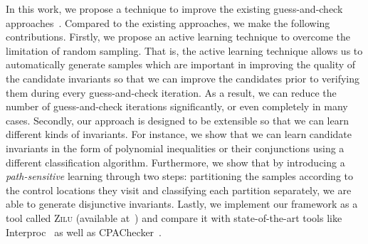 In this work, we propose a technique to improve the existing guess-and-check approaches~\cite{sharma2012interpolants,sharma2013verification,DBLP:conf/esop/0001GHALN13,sharma2014invariant}.
Compared to the existing approaches, we make the following contributions.
Firstly, we propose an active learning technique to overcome the limitation of random sampling.
That is, the active learning technique allows us to automatically generate samples which are important in improving the quality of the candidate invariants
so that we can improve the candidates prior to verifying them during every guess-and-check iteration.
As a result, we can reduce the number of guess-and-check iterations significantly, or even completely in many cases.
Secondly, our approach is designed to be extensible so that we can learn different kinds of invariants.
For instance, we show that we can learn candidate invariants in the form of polynomial inequalities or their conjunctions using a different classification algorithm.
Furthermore, we show that by introducing a {\em path-sensitive} learning through two steps:
 partitioning the samples according to the control locations they visit and classifying each partition separately, we are able to generate disjunctive invariants. Lastly, we implement our framework as a tool called \textsc{Zilu} (available at~\cite{zilu:repo}) and compare it with state-of-the-art tools like Interproc~\cite{jeannet2010interproc} as well as CPAChecker~\cite{DBLP:conf/cav/BeyerK11}.
